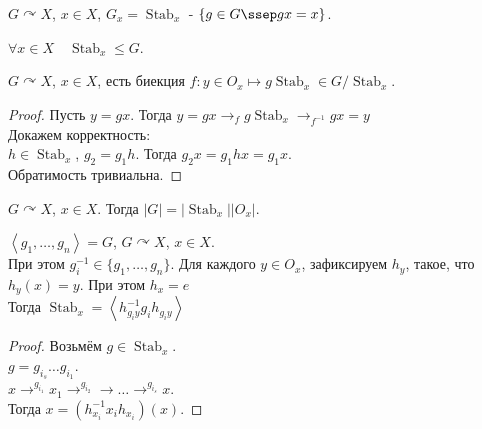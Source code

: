 \documentclass[11pt, oneside]{article}   	%
\newcommand{\actson}{\curvearrowright}
\DeclareMathOperator{\Stab}{Stab}
\begin{document}
    \begin{definition}
        $G\actson X$,  $x\in X$, $G_x = \Stab_{x}$ - $\{g\in G\ssep gx=x\} $.
    \end{definition}
    \begin{dlemma}
        $\forall{x\in X}\quad \Stab_{x} \le G$.
    \end{dlemma}
    \begin{theorem}
        $G\actson X$,  $x\in X$, есть биекция $f : y\in O_x \mapsto g\Stab_{x}\in G/\Stab_{x}$.
        \begin{proof}
            Пусть $y=gx$. Тогда  $y = gx \to_{f} g\Stab_{x} \to_{f^{-1}} gx = y$\\
           Докажем корректность:\\
           $h\in \Stab_{x}$, $g_2 = g_1h$. Тогда $g_2x = g_1hx = g_1x$.\\
           Обратимость тривиальна.
        \end{proof}
    \end{theorem}
    \begin{tlemma}
        $G\actson X$,  $x\in X$. Тогда $\left|G\right| = \left|\Stab_x\right| \left|O_{x}\right|$.
    \end{tlemma}
    \begin{tlemma}
        $\left<g_1, \ldots, g_n\right> = G$, $G\actson X$,  $x\in X$.\\
        При этом $g_i^{-1}\in \{g_1, \ldots, g_n\} $.
        Для каждого $y\in O_x$, зафиксируем $h_y$, такое, что $h_y(x) = y$. При этом $h_x = e$\\
        Тогда $\Stab_{x} = \left<h_{g_{i}y}^{-1}g_ih_{g_{i}y}\right>$
        \begin{proof}
            Возьмём $g\in \Stab_{x}$.\\
            $g = g_{i_s}\ldots g_{i_1}$.\\
            $x \to^{g_{i_1}} x_1 \to^{g_{i_2}} \to \ldots \to^{g_{i_s}} x$.\\
            Тогда $x = (h_{x_i}^{-1} x_i h_{x_i})(x)$.
        \end{proof}
    \end{tlemma}
\end{document}
